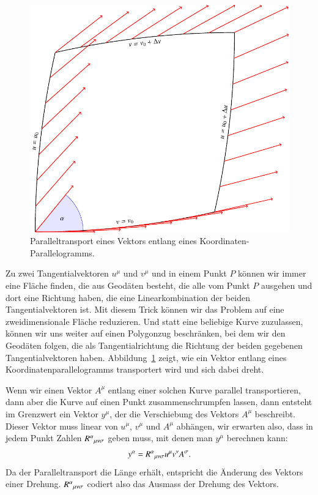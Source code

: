 \begin{figure}
\centering
\includegraphics{chapters/tikz/riemann.pdf}
\caption{Paralleltransport eines Vektors entlang eines
Koordinaten-Parallelogramms.
\label{skript:kruemmung:parallelogramm}}
\end{figure}

Zu zwei Tangentialvektoren $u^\mu$ und $v^\mu$ und in einem Punkt
$P$ können wir immer eine
Fläche finden, die aus Geodäten besteht, die alle vom Punkt $P$ ausgehen
und dort eine Richtung haben, die eine Linearkombination der beiden
Tangentialvektoren ist.
Mit diesem Trick können wir das Problem auf eine zweidimensionale
Fläche reduzieren.
Und statt eine beliebige Kurve zuzulassen, können wir uns weiter
auf einen Polygonzug beschränken, bei dem wir den Geodäten folgen,
die als Tangentialrichtung die Richtung der beiden gegebenen
Tangentialvektoren haben.
Abbildung~\ref{skript:kruemmung:parallelogramm} zeigt, wie ein Vektor
entlang eines Koordinatenparallelogramms transportert wird und sich
dabei dreht.

Wenn wir einen Vektor $A^\mu$ entlang einer solchen Kurve parallel
transportieren, dann aber die Kurve auf einen Punkt zusammenschrumpfen
lassen, dann entsteht im Grenzwert ein Vektor $y^\mu$,
der die Verschiebung des Vektors $A^\mu$ beschreibt.
Dieser Vektor muss linear von $u^\mu$, $v^\mu$ und $A^\mu$ abhängen,
wir erwarten also, dass in jedem Punkt Zahlen
$R^\alpha\mathstrut_{\mu\nu\sigma}$ geben muss, mit denen man
$y^\mu$ berechnen kann:
\[
y^\alpha = R^\alpha\mathstrut_{\mu\nu\sigma}u^\mu v^\nu A^\sigma.
\]
Da der Paralleltransport die Länge erhält, entspricht die Änderung des
Vektors einer Drehung.
$R^\alpha\mathstrut_{\mu\nu\sigma}$ codiert also das Ausmass der
Drehung des Vektors.

